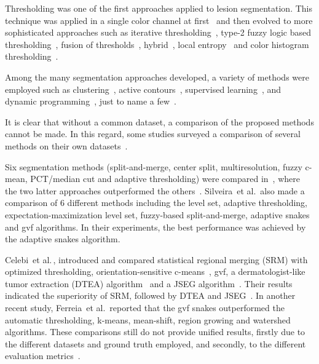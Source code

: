 Thresholding was one of the first approaches applied to lesion segmentation.
This technique was applied in a single color channel at first~\cite{Gutkowicz-Krusin1997,Fleming1998} and then evolved to more sophisticated approaches such as iterative thresholding~\cite{Rajab2004}, type-2 fuzzy logic based thresholding~\cite{Yuksel2009}, fusion of thresholds~\cite{Celebi2009c,Celebi2010, Celebi2013}, hybrid~\cite{Garnavi2011}, local entropy~\cite{Abbas2013a} and color histogram thresholding~\cite{Peruch2013}.

Among the many segmentation approaches developed, a variety of methods were employed such as clustering~\cite{Schmid1999b, Zhou2009, Mete2011, Liu2012}, active contours~\cite{Yuan2009, Zhou2011a,Erkol2005}, supervised learning~\cite{Debeir1999, Wighton2011, Wighton2011b, Zortea2011}, and dynamic programming~\cite{Abbas2012}, just to name a few~\cite{korotkov2012computerized}.

It is clear that without a common dataset, a comparison of the proposed methods cannot be made. 
In this regard, some studies surveyed a comparison of several methods on their own datasets~\cite{Hance1996,Silveira2009,Celebi2007,Celebi2008a,ferreira2013wide}.

Six segmentation methods (split-and-merge, center split, multiresolution, fuzzy c-mean, PCT/median cut and adaptive thresholding) were compared in~\cite{Hance1996}, where the two latter approaches outperformed the others~\cite{korotkov2012computerized}.
Silveira~et al.\,\cite{Silveira2009} also made a comparison of 6 different methods including the level set, adaptive thresholding, expectation-maximization level set, fuzzy-based split-and-merge, adaptive snakes and \ac{gvf} algorithms.
In their experiments, the best performance was achieved by the adaptive snakes algorithm.

Celebi~et al.\,\cite{Celebi2007,Celebi2008a}, introduced and compared statistical regional merging (SRM) with optimized thresholding, orientation-sensitive c-means~\cite{Schmid1999b}, \ac{gvf}, a dermatologist-like tumor extraction (DTEA) algorithm~\cite{Iyatomi2006} and a JSEG algorithm~\cite{Celebi2007b}.
Their results indicated the superiority of SRM, followed by DTEA and JSEG~\cite{korotkov2012computerized}.
In another recent study, Ferreia~et al.\,\cite{ferreira2013wide} reported that the \ac{gvf} snakes outperformed the automatic thresholding, k-means, mean-shift, region growing and watershed algorithms. 
These comparisons still do not provide unified results, firstly due to the different datasets and ground truth employed, and secondly, to the different evaluation metrics~\cite{korotkov2012computerized}.


